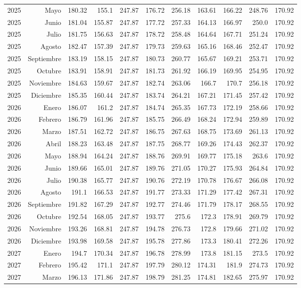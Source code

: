 \documentclass{article}%
\begin{document}
\begin{longtable}{|l r|r|r|r|r|r|r|r|r|r|}
2025&Mayo&180.32&155.1&247.87&176.72&256.18&163.61&166.22&248.76&170.92\\%
2025&Junio&181.04&155.87&247.87&177.72&257.33&164.13&166.97&250.0&170.92\\%
2025&Julio&181.75&156.63&247.87&178.72&258.48&164.64&167.71&251.24&170.92\\%
2025&Agosto&182.47&157.39&247.87&179.73&259.63&165.16&168.46&252.47&170.92\\%
2025&Septiembre&183.19&158.15&247.87&180.73&260.77&165.67&169.21&253.71&170.92\\%
2025&Octubre&183.91&158.91&247.87&181.73&261.92&166.19&169.95&254.95&170.92\\%
2025&Noviembre&184.63&159.67&247.87&182.74&263.06&166.7&170.7&256.18&170.92\\%
2025&Diciembre&185.35&160.44&247.87&183.74&264.21&167.21&171.45&257.42&170.92\\%
2026&Enero&186.07&161.2&247.87&184.74&265.35&167.73&172.19&258.66&170.92\\%
2026&Febrero&186.79&161.96&247.87&185.75&266.49&168.24&172.94&259.89&170.92\\%
2026&Marzo&187.51&162.72&247.87&186.75&267.63&168.75&173.69&261.13&170.92\\%
2026&Abril&188.23&163.48&247.87&187.75&268.77&169.26&174.43&262.37&170.92\\%
2026&Mayo&188.94&164.24&247.87&188.76&269.91&169.77&175.18&263.6&170.92\\%
2026&Junio&189.66&165.01&247.87&189.76&271.05&170.27&175.93&264.84&170.92\\%
2026&Julio&190.38&165.77&247.87&190.76&272.19&170.78&176.67&266.08&170.92\\%
2026&Agosto&191.1&166.53&247.87&191.77&273.33&171.29&177.42&267.31&170.92\\%
2026&Septiembre&191.82&167.29&247.87&192.77&274.46&171.79&178.17&268.55&170.92\\%
2026&Octubre&192.54&168.05&247.87&193.77&275.6&172.3&178.91&269.79&170.92\\%
2026&Noviembre&193.26&168.81&247.87&194.78&276.73&172.8&179.66&271.02&170.92\\%
2026&Diciembre&193.98&169.58&247.87&195.78&277.86&173.3&180.41&272.26&170.92\\%
2027&Enero&194.7&170.34&247.87&196.78&278.99&173.8&181.15&273.5&170.92\\%
2027&Febrero&195.42&171.1&247.87&197.79&280.12&174.31&181.9&274.73&170.92\\%
2027&Marzo&196.13&171.86&247.87&198.79&281.25&174.81&182.65&275.97&170.92\\%

\end{longtable}
\end{document}
